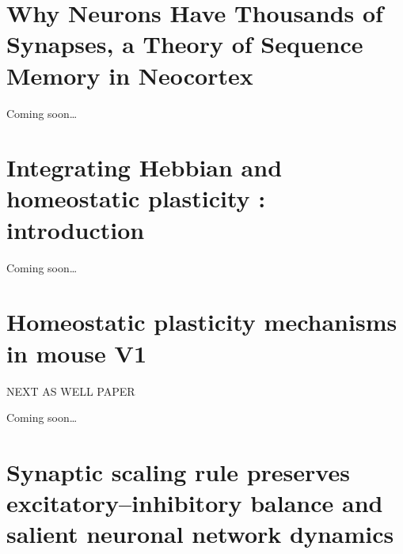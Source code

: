 \documentclass[11pt, a4paper, oneside]{article}   	%
\begin{document}
%
%



\section{Why Neurons Have Thousands of Synapses, a Theory of Sequence Memory in Neocortex \cite{Hawkins2016}}

Coming soon\ldots

\section{Integrating Hebbian and homeostatic plasticity : introduction \cite{Fox2017}}


Coming soon\ldots

\section{Homeostatic plasticity mechanisms in mouse V1 \cite{Kaneko2017}}

NEXT AS WELL PAPER 

Coming soon\ldots

\section{Synaptic scaling rule preserves excitatory–inhibitory balance and salient neuronal network dynamics \cite{Barral2016}}
\end{document}
